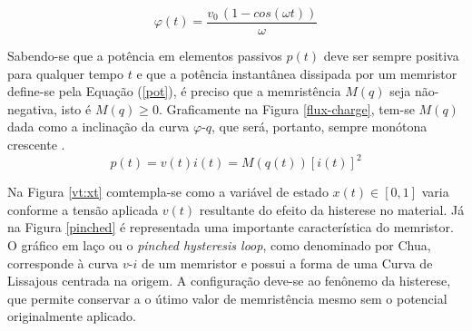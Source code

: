 \documentclass{ceel}
\begin{document}
\begin{multicols}{2}
\begin{equation}\label{flux}
\varphi(t) = \dfrac{v_0\, (1-cos(\omega t))}{\omega}
\end{equation}

Sabendo-se que a potência em elementos passivos $p(t)$ deve ser sempre positiva para qualquer tempo $t$ e que a potência instantânea dissipada por um memristor define-se pela Equação (\ref{pot}), é preciso que a memristência $M(q)$ seja não-negativa, isto é $M(q)\geq 0$. Graficamente na Figura \ref{flux-charge}, tem-se $M(q)$ dada como a inclinação da curva $\varphi$-$q$, que será, portanto, sempre monótona crescente \cite{artigo}.
\begin{equation}\label{pot}
p(t) = v(t)i(t)=M(q(t))[i(t)]^2
\end{equation}

Na Figura \ref{vt:xt} comtempla-se como a variável de estado $x(t)\in[0,1]$ varia conforme a tensão aplicada $v(t)$ resultante do efeito da histerese no material. %
%
Já na Figura \ref{pinched} é representada uma importante característica do memristor. O gráfico em laço ou o \emph{pinched hysteresis loop}, como denominado por Chua, corresponde à curva  $v$-$i$ de um memristor e possui a forma de uma Curva de Lissajous centrada na origem. A configuração deve-se ao fenônemo da histerese, que permite conservar a o útimo valor de memristência mesmo sem o potencial originalmente aplicado.


\end{multicols}
\end{document}
